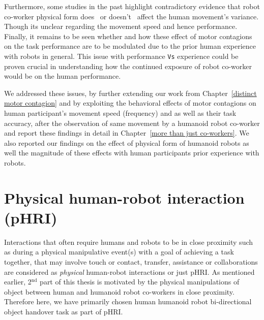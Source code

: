 Furthermore, some studies in the past highlight contradictory evidence that robot co-worker physical form does~\cite{Chaminade:JPP:2009} or doesn't~\cite{Kupferberg:PlosOne:2012} affect the human movement's variance. Though its unclear regarding the movement speed and hence performance. Finally, it remains to be seen whether and how these effect of motor contagions on the task performance are to be modulated due to the prior human experience with robots in general. This issue with performance \texttt{Vs} experience could be proven crucial in understanding how the continued exposure of robot co-worker would be on the human performance.

We addressed these issues, by further extending our work from Chapter~\ref{distinct motor contagion} and by exploiting the behavioral effects of motor contagions on human participant's movement speed (frequency) and as well as their task accuracy, after the observation of same movement by a humanoid robot co-worker and report these findings in detail in Chapter~\ref{more than just co-workers}. We also reported our findings on the effect of physical form of humanoid robots as well the magnitude of these effects with human participants prior experience with robots.




\section{Physical human-robot interaction (pHRI)}

Interactions that often require humans and robots to be in close proximity such as during a physical manipulative event(s) with a goal of achieving a task together, that may involve touch or contact, transfer, assistance or collaborations are considered as \textit{physical} human-robot interactions or just pHRI. As mentioned earlier, 2$^\text{nd}$ part of this thesis is motivated by the physical manipulations of object between human and humanoid robot co-workers in close proximity. Therefore here, we have primarily chosen human humanoid robot bi-directional object handover task as part of pHRI.  

